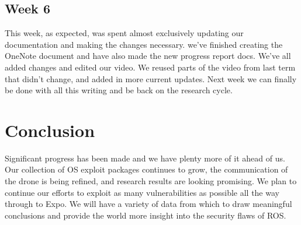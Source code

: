 \documentclass[IEEEtran,letterpaper,10pt,notitlepage,draftclsnofoot,onecolumn]{article}
\begin{document}
\subsection{Week 6}
This week, as expected, was spent almost exclusively updating our documentation and making the changes necessary. 
we've finished creating the OneNote document and have also made the new progress report docs. 
We've all added changes and edited our video. 
We reused parts of the video from last term that didn't change, and added in more current updates. 
Next week we can finally be done with all this writing and be back on the research cycle.

\section{Conclusion}
Significant progress has been made and we have plenty more of it ahead of us.
Our collection of OS exploit packages continues to grow, the communication of the drone is being refined, and research results are looking promising. 
We plan to continue our efforts to exploit as many vulnerabilities as possible all the way through to Expo.
We will have a variety of data from which to draw meaningful conclusions and provide the world more insight into the security flaws of ROS.



\end{document}
